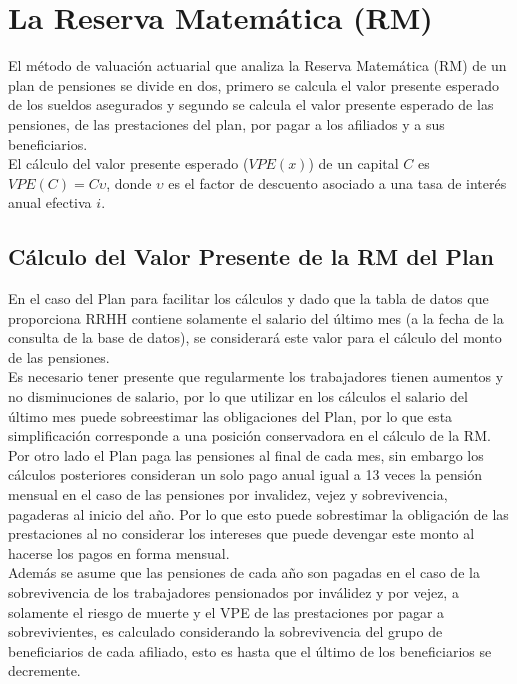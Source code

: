 \documentclass[12pt,letterpaper,titlepage]{article}
\begin{document}
{\section{La Reserva Matemática (RM)}

El método de valuación actuarial que analiza la Reserva Matemática (RM) de un plan de pensiones se divide en dos, primero se calcula el valor presente esperado de los sueldos asegurados y segundo se calcula el valor presente esperado de las pensiones, de las prestaciones del plan, por pagar a los afiliados y a sus beneficiarios.\\

El cálculo del valor presente esperado ($V\!PE(x)$) de un capital $C$ es $V\!PE(C)=C\upsilon$, donde $\upsilon$ es el factor de descuento asociado a una tasa de interés anual efectiva $i$. 


\subsection{Cálculo del Valor Presente de la RM del Plan}

En el caso del Plan para facilitar los cálculos y dado que la tabla de datos que proporciona RRHH contiene solamente el salario del último mes (a la fecha de la consulta de la base de datos), se considerará este valor para el cálculo del monto de las pensiones.\\

Es necesario tener presente que regularmente los trabajadores tienen aumentos y no disminuciones de salario, por lo que utilizar en los cálculos el salario del último mes puede sobreestimar las obligaciones del Plan, por lo que esta simplificación corresponde a una posición conservadora en el cálculo de la RM.\\

Por otro lado el Plan paga las pensiones al final de cada mes, sin embargo los cálculos posteriores consideran un solo pago anual igual a 13 veces la pensión mensual en el caso de las pensiones por invalidez, vejez y sobrevivencia, pagaderas al inicio del año. Por lo que esto puede sobrestimar la obligación de las prestaciones  al no considerar los intereses que puede devengar este monto al hacerse los pagos en forma mensual.\\

Además se asume que las pensiones de cada año son pagadas en el caso de la sobrevivencia de los trabajadores pensionados por inválidez y por vejez, a solamente el riesgo de muerte y el VPE de las prestaciones por pagar a sobrevivientes, es calculado considerando la sobrevivencia del grupo de beneficiarios de cada afiliado, esto es hasta que el último de los beneficiarios se decremente.\\

}
\end{document}

